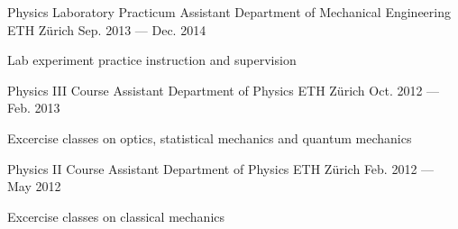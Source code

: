 \begin{cventries}
  \cventry
    {Physics Laboratory Practicum Assistant} %
    {Department of Mechanical Engineering} %
    {ETH Z{\"u}rich} %
    {Sep. 2013 --- Dec. 2014} %
    {
      \begin{cvitems} %
        \item {Lab experiment practice instruction and supervision}
      \end{cvitems}
    }

  \cventry
    {Physics III Course Assistant} %
    {Department of Physics} %
    {ETH Z{\"u}rich} %
    {Oct. 2012 --- Feb. 2013} %
    {
      \begin{cvitems} %
        \item {Excercise classes on optics, statistical mechanics and quantum mechanics}
      \end{cvitems}
    }

  \cventry
    {Physics II Course Assistant} %
    {Department of Physics} %
    {ETH Z{\"u}rich} %
    {Feb. 2012 --- May 2012} %
    {
      \begin{cvitems} %
        \item {Excercise classes on classical mechanics}
      \end{cvitems}
    }

\end{cventries}
